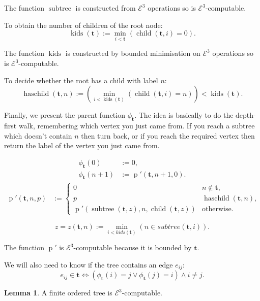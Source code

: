\documentclass[a4paper]{article}
\newcommand{\grz}[1]{$\mathcal{E}^{#1}$}	%
\newcommand{\tvec}{\mathbf{t}}	%
\newcommand{\recur}[1]{\begin{equation} \begin{split} #1 \end{split} \end{equation}}	%
\newcommand{\recurN}[1]{\begin{equation*} \begin{split} #1 \end{split} \end{equation*}}	%
\theoremstyle{plain}
\theoremstyle{definition}
\newtheorem{lemma}[theorem]{Lemma}
\begin{document}
The function $\operatorname{subtree}$ is constructed from \grz{3} operations so is \grz{3}-computable.

To obtain the number of children of the root node:
\begin{equation} \operatorname{kids}(\tvec) := \min_{i < \tvec} (\operatorname{child}(\tvec,i)=0). \end{equation}

The function $\operatorname{kids}$ is constructed by bounded minimisation on \grz{3} operations so is \grz{3}-computable.

To decide whether the root has a child with label $n$:
\begin{equation} \operatorname{haschild}(\tvec,n) :=  \left( \min_{i < \operatorname{kids}(\tvec)}({\operatorname{child}(\tvec,i)=n}) \right) < \operatorname{kids}(\tvec). \end{equation}


Finally, we present the parent function $\phi_{\tvec}$. The idea is basically to do the depth-first walk, remembering which vertex you just came from. If you reach a subtree which doesn't contain $n$ then turn back, or if you reach the required vertex then return the label of the vertex you just came from.

\recur{
\phi_{\tvec}(0) &:= 0, \\
\phi_{\tvec}(n+1) &:= \operatorname{p}'(\tvec,n+1,0).
}
\recurN{
\operatorname{p}'(\tvec,n,p) &:= \begin{cases}
						0 & n \not \in \tvec, \\
						p & \operatorname{haschild}(\tvec,n), \\
						\operatorname{p}'(\operatorname{subtree}(\tvec,z),n,\operatorname{child}(\tvec,z)) & \textrm{otherwise.}
					\end{cases}
}

\begin{equation*} z=z(\tvec,n) := \min_{i < kids(\tvec)}(n \in subtree(\tvec,i)). \end{equation*}

The function $\operatorname{p}'$ is \grz{3}-computable because it is bounded by $\tvec$.

We will also need to know if the tree contains an edge $e_{ij}$:
\begin{equation} e_{ij} \in \tvec \Leftrightarrow \left ( \phi_{\tvec}(i) = j \vee \phi_{\tvec}(j) = i \right ) \wedge i \neq j. \end{equation}


\begin{lemma}
A finite ordered tree is \grz{3}-computable.
\end{lemma}
\end{document}
